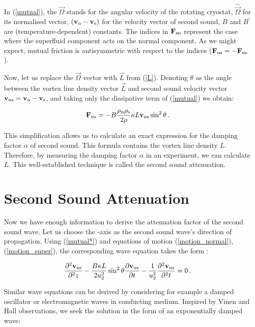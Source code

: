 In (\ref{mutual}), the $\vec{\Omega}$ stands for the angular velocity of the rotating cryostat, $\hat{\vec{\Omega}}$ for its normalised vector, $(\mathbf{v}_{\mathrm{n}} - \mathbf{v}_{\mathrm{s}})$ for the velocity vector of second sound, $B$ and $B^{\prime}$ are (temperature-dependent) constants. The indices  in $\mathbf{F}_{\mathrm{sn}}$ represent the case where the superfluid component acts on the normal component. As we might expect, mutual friction is antisymmetric with respect to the indices ($\mathbf{F}_{\mathrm{ns}} = - \mathbf{F}_{\mathrm{sn}}$).

\newpage

Now, let us replace the $\vec{\Omega}$ vector with $\vec{L}$ from (\ref{L}). Denoting $\theta$ as the angle between the vortex line density vector $\vec{L}$ and second sound velocity vector $\mathbf{v}_{\mathrm{ns}} = \mathbf{v}_{\mathrm{n}} - \mathbf{v}_{\mathrm{s}}$, and taking only the dissipative term of (\ref{mutual}) we obtain:

$$
\mathbf{F}_{\mathrm{sn}}
= -B \frac{\rho_{\mathrm{n}} \rho_{\mathrm{s}}}{2\rho} \kappa L
\mathbf{v}_{\mathrm{ns}} \sin^2\theta\,.
\label{mutual*}
$$

This simplification allows us to calculate an exact expression for the damping factor $\alpha$ of second sound. This formula contains the vortex line density $L$. Therefore, by measuring the damping factor $\alpha$ in an experiment, we can calculate $L$. This well-established technique is called the second sound attenuation.

\section{Second Sound Attenuation}

Now we have enough information to derive the attenuation factor of the second sound wave. Let us choose the -axis as the second sound wave's direction of propagation. Using (\ref{mutual*}) and equations of motion (\ref{motion_normal}), (\ref{motion_super}), the corresponding wave equation takes the form \cite{varga}:

\begin{equation}
\frac{\partial^2 \mathbf{v}_{\mathrm{ns}}}{\partial^2 z}
-
\frac{B\kappa L}{2 u_2^2}\sin^2\theta
\frac{\partial \mathbf{v}_{\mathrm{ns}}}{\partial t}
-
\frac{1}{u_2^2}
\frac{\partial^2 \mathbf{v}_{\mathrm{ns}}}{\partial^2 t}
=
0\,.
\label{ss_wave}
\end{equation}

Similar wave equations can be derived by considering for example a damped oscillator or electromagnetic waves in conducting medium. Inspired by Vinen and Hall observations, we seek the solution in the form of an exponentially damped wave:

